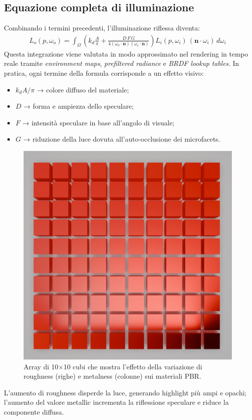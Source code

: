 \documentclass[12pt,a4paper,openright,twoside]{book}
\begin{document}
\subsection*{Equazione completa di illuminazione}
Combinando i termini precedenti, l'illuminazione riflessa diventa:
\begin{align*}
L_o(p,\omega_o) =
\int_{\Omega}
\left(
k_d\frac{A}{\pi} +
\frac{D\,F\,G}
{4(\omega_o\cdot\mathbf{n})(\omega_i\cdot\mathbf{n})}
\right)
L_i(p,\omega_i)\,
(\mathbf{n}\cdot\omega_i)\,d\omega_i
\end{align*}
\noindent
Questa integrazione viene valutata in modo approssimato nel rendering in tempo reale tramite
\emph{environment maps}, \emph{prefiltered radiance} e \emph{BRDF lookup tables}.
In pratica, ogni termine della formula corrisponde a un effetto visivo:
\begin{itemize}
    \item $k_d A/\pi$ → colore diffuso del materiale;
    \item $D$ → forma e ampiezza dello speculare;
    \item $F$ → intensità speculare in base all'angolo di visuale;
    \item $G$ → riduzione della luce dovuta all'auto-occlusione dei microfacets.
\end{itemize}
\begin{figure}[H]
   \centering
   \includegraphics[width=.6\linewidth]{figures/pbr_material_render.png}
   \caption{Array di 10$\times$10 cubi che mostra l'effetto della variazione di roughness (righe) e metalness
      (colonne) sui materiali PBR.}
   \label{fig:pbr-material-render}
\end{figure}
\noindent
L'aumento di roughness disperde la luce, generando highlight più ampi e opachi;
l'aumento del valore metallic incrementa la riflessione speculare e riduce la componente diffusa.
\end{document}
